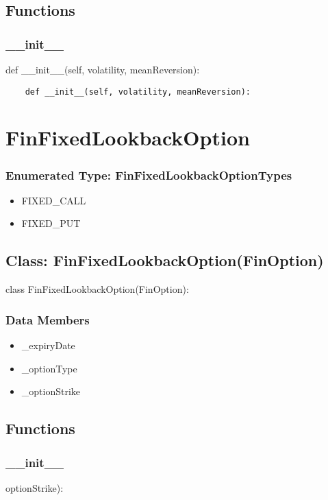 \documentclass[twoside,11pt]{book}
\begin{document}
\subsection*{Functions}

\subsubsection*{{\bf \_\_init\_\_}}
def \_\_init\_\_(self, volatility, meanReversion): 

\begin{lstlisting}
    def __init__(self, volatility, meanReversion):
\end{lstlisting}

\newpage
\section{FinFixedLookbackOption}

\subsubsection{Enumerated Type: FinFixedLookbackOptionTypes}
\begin{itemize}
\item{FIXED\_CALL}
\item{FIXED\_PUT}
\end{itemize}

\subsection*{Class: FinFixedLookbackOption(FinOption)}
class FinFixedLookbackOption(FinOption): 

\subsubsection*{Data Members}
\begin{itemize}
\item{\_expiryDate}
\item{\_optionType}
\item{\_optionStrike}
\end{itemize}

\subsection*{Functions}

\subsubsection*{{\bf \_\_init\_\_}}
optionStrike): 
\end{document}
